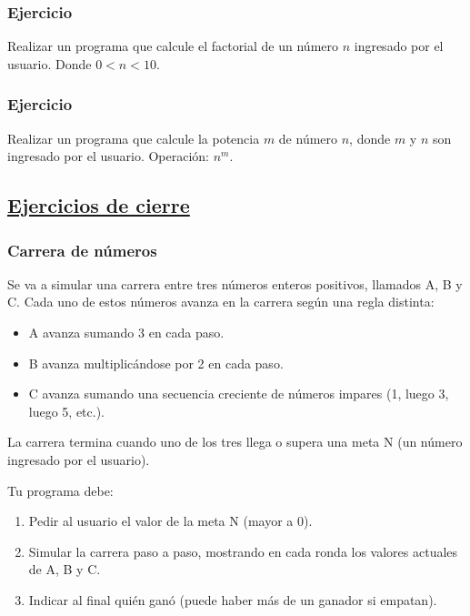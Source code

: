 \subsubsection{Ejercicio}
Realizar un programa que calcule el factorial de un número $n$ ingresado por el usuario. Donde $0<n<10$.
{\small
  \lstset{inputencoding=utf8/latin1}
  
}

\subsubsection{Ejercicio }
Realizar un programa que calcule la potencia $m$ de número $n$, donde $m$ y $n$ son ingresado por el usuario. Operación: $n^m$.
{\small
  \lstset{inputencoding=utf8/latin1}
  
}


\subsection*{\underline{Ejercicios de cierre}}

\subsubsection{Carrera de números}
Se va a simular una carrera entre tres números enteros positivos, llamados A, B y C. Cada uno de estos números avanza en la carrera según una regla distinta:

\begin{itemize}
  \item A avanza sumando 3 en cada paso.
  \item B avanza multiplicándose por 2 en cada paso.
  \item C avanza sumando una secuencia creciente de números impares (1, luego 3, luego 5, etc.).
\end{itemize}

La carrera termina cuando uno de los tres llega o supera una meta N (un número ingresado por el usuario).

Tu programa debe:

\begin{enumerate}
  \item Pedir al usuario el valor de la meta N (mayor a 0).
  \item Simular la carrera paso a paso, mostrando en cada ronda los valores actuales de A, B y C.
  \item Indicar al final quién ganó (puede haber más de un ganador si empatan).
\end{enumerate}

